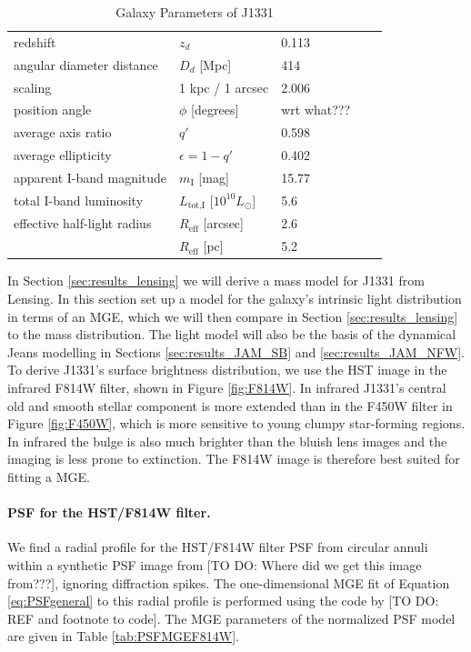 \begin{table}
\centering
\caption{Galaxy Parameters of J1331}
\begin{tabular}{lllrl}
\hline
redshift                  & $z_d$ & 0.113 & \citep{SWELLSIII}\\
angular diameter distance & $D_d$ [Mpc] & 414 & \\
scaling                   & 1 kpc / 1 arcsec & 2.006 & \\
position angle            & $\phi$ [degrees] & wrt what???\\
average axis ratio & $q'$ & 0.598\\
average ellipticity & $\epsilon = 1 - q'$ & 0.402 & \\
apparent I-band magnitude & $m_\text{I}$ [mag] & 15.77 & \\
total I-band luminosity & $L_\text{tot,I}$ [$10^{10} L_\odot$] & 5.6 & \\
effective half-light radius & $R_\text{eff}$ [arcsec] & 2.6 & \\
& $R_\text{eff}$ [pc]& 5.2 & \\
\hline
\end{tabular}
\label{tab:galaxyparameters}
\end{table}


In Section \ref{sec:results_lensing} we will derive a mass model for J1331 from Lensing. In this section set up a model for the galaxy's intrinsic light distribution in terms of an MGE, which we will then compare in Section \ref{sec:results_lensing} to the mass distribution. The light model will also be the basis of the dynamical Jeans modelling in Sections \ref{sec:results_JAM_SB} and \ref{sec:results_JAM_NFW}.
\\To derive J1331's surface brightness distribution, we use the HST image in the infrared F814W filter, shown in Figure \ref{fig:F814W}. In infrared J1331's central old and smooth stellar component is more extended than in the F450W filter in Figure \ref{fig:F450W}, which is more sensitive to young clumpy star-forming regions. In infrared the bulge is also much brighter than the bluish lens images and the imaging is less prone to extinction. The F814W image is therefore best suited for fitting a MGE. 

\paragraph{PSF for the HST/F814W filter.} We find a radial profile for the HST/F814W filter PSF from circular annuli within a synthetic PSF image from [TO DO: Where did we get this image from???], ignoring diffraction spikes. The one-dimensional MGE fit of Equation \ref{eq:PSFgeneral} to this radial profile is performed using the code by [TO DO: REF and footnote to code]. The MGE parameters of the normalized PSF model are given in Table \ref{tab:PSFMGEF814W}.

